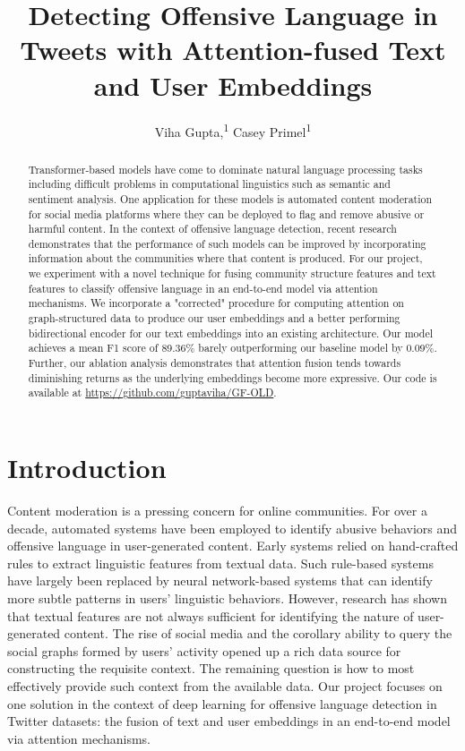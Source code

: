 \documentclass[letterpaper]{article} %
\title{Detecting Offensive Language in Tweets with Attention-fused Text and User Embeddings}
\author {
    Viha Gupta,\textsuperscript{\rm 1}
    Casey Primel\textsuperscript{\rm 1}
}
\begin{document}
\maketitle

\begin{abstract}
    Transformer-based models have come to dominate natural language processing tasks including difficult problems in computational linguistics such as semantic and sentiment analysis. One application for these models is automated content moderation for social media platforms where they can be deployed to flag and remove abusive or harmful content. In the context of offensive language detection, recent research demonstrates that the performance of such models can be improved by incorporating information about the communities where that content is produced. For our project, we experiment with a novel technique for fusing community structure features and text features to classify offensive language in an end-to-end model via attention mechanisms. We incorporate a "corrected" procedure for computing attention on graph-structured data to produce our user embeddings and a better performing bidirectional encoder for our text embeddings into an existing architecture. Our model achieves a mean F1 score of 89.36\% barely outperforming our baseline model by 0.09\%. Further, our ablation analysis demonstrates that attention fusion tends towards diminishing returns as the underlying embeddings become more expressive. Our code is available at \url{https://github.com/guptaviha/GF-OLD}.
\end{abstract}

\section{Introduction}

Content moderation is a pressing concern for online communities. For over a decade, automated systems have been employed to identify abusive behaviors and offensive language in user-generated content. Early systems relied on hand-crafted rules to extract linguistic features from textual data. Such rule-based systems have largely been replaced by neural network-based systems that can identify more subtle patterns in users' linguistic behaviors. However, research has shown that textual features are not always sufficient for identifying the nature of user-generated content. The rise of social media and the corollary ability to query the social graphs formed by users' activity opened up a rich data source for constructing the requisite context. The remaining question is how to most effectively provide such context from the available data. Our project focuses on one solution in the context of deep learning for offensive language detection in Twitter datasets: the fusion of text and user embeddings in an end-to-end model via attention mechanisms.
\end{document}
